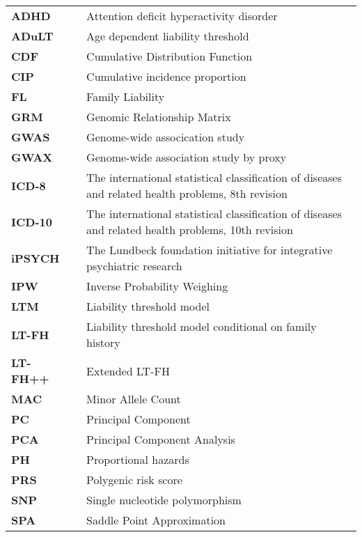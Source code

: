 \begin{table}[h]
	\begin{tabularx}{\textwidth}{l p{0.7cm} p{10cm}}
		\textbf{ADHD}	& 	&	Attention deficit hyperactivity disorder				\\
		\textbf{ADuLT}	&	&	Age dependent liability threshold						\\
		\textbf{CDF}	&	&	Cumulative Distribution Function						\\
		\textbf{CIP} 	&	&	Cumulative incidence proportion  						\\
		\textbf{FL}		&	&	Family Liability										\\
		\textbf{GRM}	&	&	Genomic Relationship Matrix								\\
		\textbf{GWAS}	&	&	Genome-wide assocication study 							\\
		\textbf{GWAX}	&	&	Genome-wide association study by proxy      			\\
		\textbf{ICD-8} 	&	&	The international statistical classification of diseases and related health problems, 8th revision\\
		\textbf{ICD-10} &	&	The international statistical classification of diseases and related health problems, 10th revision \\
		\textbf{iPSYCH} &	&	The Lundbeck foundation initiative for integrative psychiatric research \\
		\textbf{IPW}	&	&	Inverse Probability Weighing							\\
		\textbf{LTM}	&	&	Liability threshold model								\\
		\textbf{LT-FH}	&	&	Liability threshold model conditional on family history	\\
		\textbf{LT-FH++}&	&	Extended LT-FH                                          \\
		\textbf{MAC}	&	&	Minor Allele Count										\\
		\textbf{PC}		&	&	Principal Component										\\
		\textbf{PCA}	&	&	Principal Component Analysis							\\
		\textbf{PH}		&	& 	Proportional hazards                                    \\
		\textbf{PRS}	&	&	Polygenic risk score									\\
		\textbf{SNP}	&	&	Single nucleotide polymorphism 							\\
		\textbf{SPA}	&	& 	Saddle Point Approximation
	\end{tabularx}
\end{table}